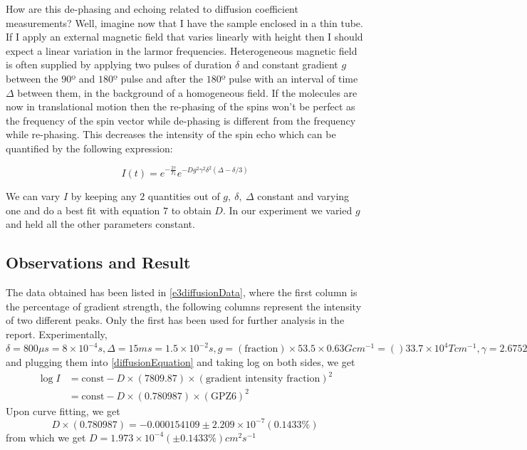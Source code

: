 		How are this de-phasing and echoing related to diffusion coefficient
		measurements? Well, imagine now that I have the sample enclosed in
		a thin tube. If I apply an external magnetic field that varies linearly
		with height then I should expect a linear variation in the larmor
		frequencies. Heterogeneous magnetic field is often supplied by applying
		two pulses of duration $\delta$ and constant gradient $g$ between
		the $90$º and $180\text{º}$ pulse and after the $180$º pulse with
		an interval of time $\Delta$ between them, in the background of a
		homogeneous field. If the molecules are now in translational motion
		then the re-phasing of the spins won't be perfect as the frequency
		of the spin vector while de-phasing is different from the frequency
		while re-phasing. This decreases the intensity of the spin echo which
		can be quantified by the following expression:

		\begin{equation}
		I(t)=e^{-\frac{2\tau}{T_{2}}}e^{-Dg^{2}\gamma^{2}\delta^{2}(\Delta-\delta/3)}
		\end{equation}\label{diffusionEquation}

		We can vary $I$ by keeping any $2$ quantities out of $g,\ \delta,\ \Delta$
		constant and varying one and do a best fit with equation $7$ to obtain
		$D.$ In our experiment we varied $g$ and held all the other parameters
		constant. 

	\subsection{Observations and Result}
		The data obtained has been listed in \autoref{e3diffusionData}, where the first column is the percentage of gradient strength, the following columns represent the intensity of two different peaks. Only the first has been used for further analysis in the report.
		Experimentally, $\delta = 800 \mu s = 8\times 10^{-4}s, \Delta=15 ms=1.5\times10^{-2}s,g=( \text{fraction}) \times 53.5 \times 0.63 G cm^{-1}= () 33.7\times 10^4 Tcm^{-1}, \gamma = 2.675 222 \times 10^8 s^{-1}T^{-1}$ and plugging them into \autoref{diffusionEquation} and taking log on both sides, we get 
		\begin{align}
			\log I &= \text{const} - D\times(7809.87)\times(\text{gradient intensity fraction})^2 \\
					&= \text{const} - D\times(0.780987)\times(\text{GPZ6})^2
		\end{align}
		Upon curve fitting, we get 
		\begin{equation}
			D\times(0.780987)=-0.000154109 \pm 2.209\times 10^{-7} (0.1433\%)
		\end{equation}
		from which we get $D=1.973\times 10^{-4} (\pm 0.1433\%) cm^2 s^{-1}$
		\label{e3diffusionData}

